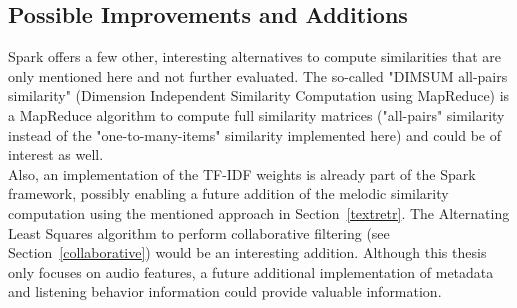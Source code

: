 \subsection{Possible Improvements and Additions}

Spark offers a few other, interesting alternatives to compute similarities that are only mentioned here and not further evaluated.  
The so-called "DIMSUM all-pairs similarity" (Dimension Independent Similarity Computation using MapReduce) is a MapReduce algorithm to compute full similarity matrices ("all-pairs" similarity instead of the "one-to-many-items" similarity implemented here) and could be of interest as well.\\
Also, an implementation of the TF-IDF weights is already part of the Spark framework, possibly enabling a future addition of the melodic similarity computation using the mentioned approach in Section~\ref{textretr}.
The Alternating Least Squares algorithm to perform collaborative filtering (see Section~\ref{collaborative}) would be an interesting addition. Although this thesis only focuses on audio features, a future additional implementation of metadata and listening behavior information could provide valuable information.\\ 